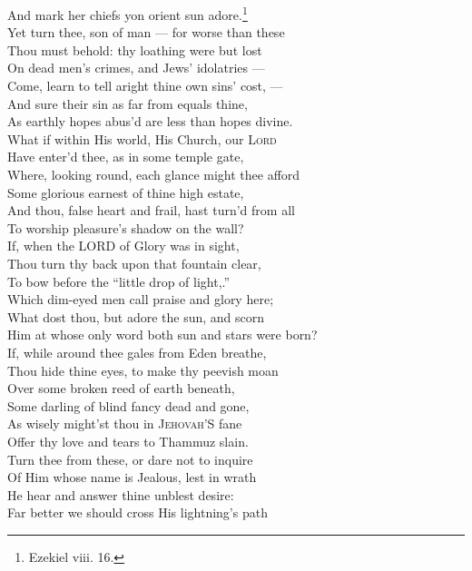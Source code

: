  And mark her chiefs yon orient sun adore.\footnote{Ezekiel viii. 16.} \\
  Yet turn thee, son of man — for worse than these \\
 Thou must behold: thy loathing were but lost \\
 On dead men’s crimes, and Jews’ idolatries — \\
 Come, learn to tell aright thine own sins’ cost, — \\
 And sure their sin as far from equals thine, \\
 As earthly hopes abus’d are less than hopes divine. \\
  What if within His world, His Church, our \textsc{Lord} \\
 Have enter’d thee, as in some temple gate, \\
 Where, looking round, each glance might thee afford \\
 Some glorious earnest of thine high estate, \\
 And thou, false heart and frail, hast turn’d from all \\
 To worship pleasure’s shadow on the wall? \\
  If, when the LORD of Glory was in sight, \\
 Thou turn thy back upon that fountain clear, \\
 To bow before the “little drop of light,.” \\
 Which dim-eyed men call praise and glory here; \\
 What dost thou, but adore the sun, and scorn \\
 Him at whose only word both sun and stars were born? \\
  If, while around thee gales from Eden breathe, \\
 Thou hide thine eyes, to make thy peevish moan \\
 Over some broken reed of earth beneath, \\
 Some darling of blind fancy dead and gone, \\
 As wisely might’st thou in \textsc{Jehovah}’S fane \\
 Offer thy love and tears to Thammuz slain. \\
  Turn thee from these, or dare not to inquire \\
 Of Him whose name is Jealous, lest in wrath \\
 He hear and answer thine unblest desire: \\
 Far better we should cross His lightning’s path \\

